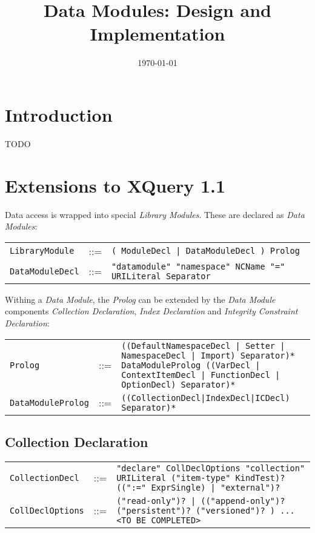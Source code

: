 \documentclass[]{article}
\title{Data Modules: Design and Implementation}
\author{  }
\date{\today}
\begin{document}
\ifpdf
{}
\else
{}
\fi

\maketitle



\section{Introduction}
TODO 


\section{Extensions to XQuery 1.1}
Data access is wrapped into special \textit{Library Modules}. These are declared as \textit{Data Modules}:

\vspace{0.25cm}
\begin{tabular}{l c p{12cm}}
{\tt LibraryModule}  & ::= & {\tt ( ModuleDecl | DataModuleDecl ) Prolog} \\
{\tt DataModuleDecl} & ::= & {\tt "datamodule" "namespace" NCName "=" URILiteral\ Separator}
\end{tabular}

\vspace{0.5cm}
\noindent
Withing a \textit{Data Module}, the \textit{Prolog} can be extended by the \textit{Data Module} components \textit{Collection Declaration}, \textit{Index Declaration} and \textit{Integrity Constraint Declaration}:
\par
\vspace{0.25cm}
\begin{tabular}{l c p{12cm}}
{\tt Prolog}           & ::= & {\tt ((DefaultNamespaceDecl | Setter | NamespaceDecl | Import) Separator)* DataModuleProlog ((VarDecl | ContextItemDecl | FunctionDecl | OptionDecl) Separator)*} \\
{\tt DataModuleProlog} & ::= & {\tt ((CollectionDecl|IndexDecl|ICDecl) Separator)*} 
\end{tabular}

\subsection{Collection Declaration}
\begin{tabular}{l c p{12cm}}
{\tt CollectionDecl}  & ::= & {\tt "declare" CollDeclOptions "collection" URILiteral ("item-type" KindTest)? ((":=" ExprSingle) | "external")?} \\
{\tt CollDeclOptions} & ::= & {\tt ("read-only")? | (("append-only")? ("persistent")? ("versioned")? ) ... <TO BE COMPLETED> }
\end{tabular}
\end{document}
